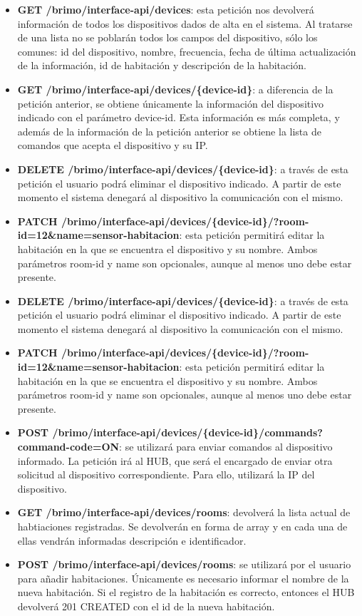 \begin{itemize}
\setlength\itemsep{6pt plus 1pt minus 1pt}
\item \textbf{GET /brimo/interface-api/devices}: esta petición nos devolverá información de todos los dispositivos
dados de alta en el sistema. Al tratarse de una lista no se poblarán todos los campos del dispositivo, sólo los comunes: id del dispositivo, nombre,
frecuencia, fecha de última actualización de la información, id de habitación y descripción de la habitación.
\item \textbf{GET /brimo/interface-api/devices/\{device-id\}}: a diferencia de la petición anterior, se obtiene únicamente la información
del dispositivo indicado con el parámetro device-id. Esta información es más completa, y además de la información de la petición anterior
se obtiene la lista de comandos que acepta el dispositivo y su IP.
\item \textbf{DELETE /brimo/interface-api/devices/\{device-id\}}: a través de esta petición el usuario podrá eliminar el dispositivo indicado. A partir
de este momento el sistema denegará al dispositivo la comunicación con el mismo.
\item \textbf{PATCH /brimo/interface-api/devices/\{device-id\}/?room-id=12\&name=sensor-habitacion}: esta petición permitirá editar la habitación
en la que se encuentra el dispositivo y su nombre. Ambos parámetros room-id y name son opcionales, aunque al menos uno debe estar presente.
\item \textbf{DELETE /brimo/interface-api/devices/\{device-id\}}: a través de esta petición el usuario podrá eliminar el dispositivo indicado. A partir
de este momento el sistema denegará al dispositivo la comunicación con el mismo.
\item \textbf{PATCH /brimo/interface-api/devices/\{device-id\}/?room-id=12\&name=sensor-habitacion}: esta petición permitirá editar la habitación
en la que se encuentra el dispositivo y su nombre. Ambos parámetros room-id y name son opcionales, aunque al menos uno debe estar presente.
\item \textbf{POST /brimo/interface-api/devices/\{device-id\}/commands?command-code=ON}: se utilizará para enviar comandos al dispositivo informado.
La petición irá al HUB, que será el encargado de enviar otra solicitud al dispositivo correspondiente. Para ello, utilizará la IP del dispositivo.
\item \textbf{GET /brimo/interface-api/devices/rooms}: devolverá la lista actual de habtiaciones registradas. Se devolverán en forma de 
array y en cada una de ellas vendrán informadas descripción e identificador.
\item \textbf{POST /brimo/interface-api/devices/rooms}: se utilizará por el usuario para añadir habitaciones. Únicamente es necesario informar
el nombre de la nueva habitación. Si el registro de la habitación es correcto, entonces el HUB devolverá 201 CREATED con el id de la nueva habitación.

\end{itemize}



